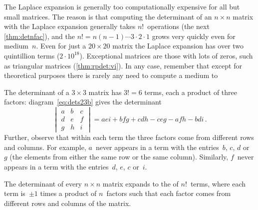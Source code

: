 The Laplace expansion is generally too computationally expensive for all but small matrices.
The reason is that computing the determinant of an \(n\times n\) matrix with the Laplace expansion generally takes \(n!\)~operations (the next \cref{thm:detnfac}), and the  \(n!=n(n-1)\cdots3\cdot2\cdot1\) grows very quickly even for medium~\(n\).
Even for just a \(20\times20\) matrix the Laplace expansion has over two quintillion terms (\(2\cdot10^{18}\)).
Exceptional matrices are those with lots of zeros, such as triangular matrices (\cref{thm:rpdet:vi}).
In any case, remember that except for theoretical purposes there is rarely any need to compute a medium to 



\begin{example} 
The determinant of a \(3\times3\) matrix has \(3!=6\) terms, each a product of three factors:
diagram~\eqref{eq:dets23b} gives the determinant
\begin{equation*}
\begin{vmatrix} a&b&c\\d&e&f\\g&h&i \end{vmatrix}=aei+bfg+cdh-ceg-afh-bdi\,.
\end{equation*}
Further, observe that within each term the three factors come from different rows and columns.
For example, \(a\)~never appears in a term with the entries~\(b\), \(c\), \(d\) or~\(g\) (the elements from either the same row or the same column).
Similarly, \(f\)~never appears in a term with the entries~\(d\), \(e\), \(c\) or~\(i\).
\end{example}



\begin{theorem} \label{thm:detnfac}
The determinant of every \(n\times n\) matrix expands to the  of \(n!\)~terms, where each term is~\(\pm1\) times a product of \(n\)~factors such that each factor comes from different rows and columns of the matrix.
\end{theorem}

